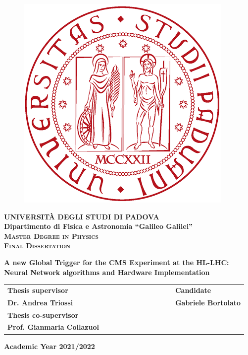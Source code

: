 \frontmatter
\begin{titlepage}
\vspace{5mm}
\begin{figure}[hbtp]
\centering
\includegraphics[scale=.13]{figure/UNIPD.png}
\end{figure}
\vspace{5mm}
\begin{center}
{{\huge{\textsc{\bf UNIVERSIT\`A DEGLI STUDI DI PADOVA}}}\\}
\vspace{5mm}
{\Large{\bf Dipartimento di Fisica e Astronomia ``Galileo Galilei''}} \\
\vspace{5mm}
{\Large{\textsc{\bf Master Degree in Physics}}}\\
\vspace{20mm}
{\Large{\textsc{\bf Final Dissertation}
}}\\
\vspace{30mm}
\begin{spacing}{3}
{\LARGE \textbf{A new Global Trigger for the CMS Experiment at the HL-LHC: Neural Network algorithms and Hardware Implementation}}\\
\end{spacing}
\vspace{8mm}
\end{center}

\vspace{20mm}
\begin{spacing}{2}
\begin{tabular}{ l  c  c c c  cc c c c c  l }
{\Large{\bf Thesis supervisor}} &&&&&&&&&&& {\Large{\bf Candidate}}\\
{\Large{\bf Dr. Andrea Triossi}} &&&&&&&&&&& {\Large{\bf Gabriele Bortolato}}\\
{\Large{\bf Thesis co-supervisor}}\\
{\Large{\bf Prof. Gianmaria Collazuol}}\\
\end{tabular}
\end{spacing}
\vspace{15 mm}

\begin{center}
{\Large{\bf Academic Year 2021/2022}}
\end{center}
\end{titlepage}
\clearpage{\pagestyle{empty}\cleardoublepage}